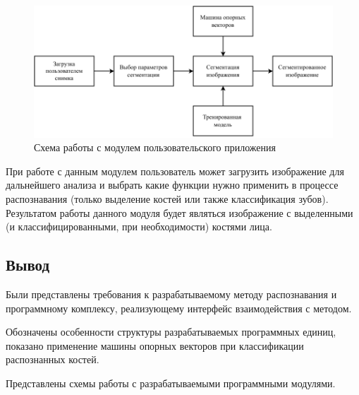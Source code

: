 \begin{figure}[H]
	\centering
	\includegraphics[width=\textwidth]{img/appuser.pdf}
	\caption{Схема работы с модулем пользовательского приложения}
	\label{fig:appuser}
\end{figure}

При работе с данным модулем пользователь может загрузить изображение для дальнейшего анализа и выбрать какие функции нужно применить в процессе распознавания (только выделение костей или также классификация зубов). Результатом работы данного модуля будет являться изображение с выделенными (и классифицированными, при необходимости) костями лица.

\subsection*{Вывод}

Были представлены требования к разрабатываемому методу распознавания и программному комплексу, реализующему интерфейс взаимодействия с методом.

Обозначены особенности структуры разрабатываемых программных единиц, показано применение машины опорных векторов при классификации распознанных костей.

Представлены схемы работы с разрабатываемыми программными модулями.